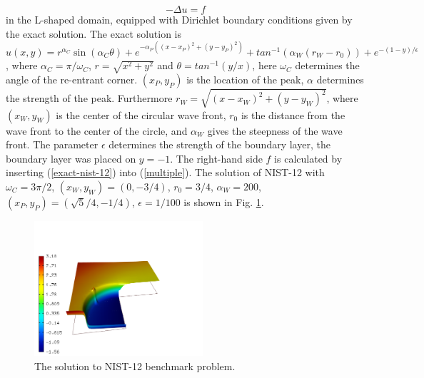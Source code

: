\documentclass[12pt]{elsarticle}
\begin{document}
\begin{equation} \label{multiple}
-\Delta u = f
\end{equation}
in the L-shaped domain, equipped with Dirichlet boundary conditions
given by the exact solution.
The exact solution is
$u(x,y) =  r^{\alpha_{C} }\sin(\alpha_{C} \theta)
+ e^{-\alpha_{P} ((x - x_{P})^{2} + (y - y_{P})^{2})}
+ tan^{-1}(\alpha_{W} (r_{W} - r_{0}))
+ e^{-(1 - y) / \epsilon}$,
where $\alpha_C = \pi / \omega_C$, $r = \sqrt{x^2+y^2}$
and $\theta = tan^{-1}(y/x)$, here $\omega_C$ determines
the angle of the re-entrant corner.
$(x_{P}, y_{P})$ is the location of the peak, $\alpha$
determines the strength of the peak. Furthermore
$r_{W} = \sqrt{(x - x_{W})^{2} + (y - y_{W})^{2}}$,
where $(x_{W}, y_{W})$ is the center of the circular wave front,
$r_{0}$ is the distance from the wave front to the
center of the circle, and $\alpha_W$ gives
the steepness of the wave front. The parameter $\epsilon$ determines the
strength of the boundary layer, the boundary layer was placed on $y = -1$.
The right-hand side $f$ is calculated by inserting (\ref{exact-nist-12})
into (\ref{multiple}).
The solution of NIST-12 with $\omega_C = 3 \pi /2$,
$(x_{W}, y_{W}) = (0, -3/4)$, $r_{0} = 3/4$, $\alpha_{W} = 200$,
$(x_{P}, y_{P}) = (\sqrt{5} / 4, -1/4)$,
$\epsilon = 1/100$ is shown in Fig. \ref{fig:sln-nist12}.

\begin{figure}[!ht]
\centering
\includegraphics[height=5cm]{nist/nist-12/solution.png}
\caption{The solution to NIST-12 benchmark problem.}
\label{fig:sln-nist12}
\end{figure}
\end{document}
